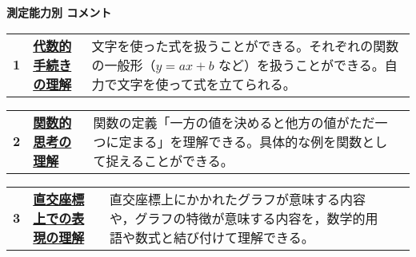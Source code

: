 \textbf{測定能力別 コメント}\par\vspace*{0.3\baselineskip}
\begin{tabularx}{0.98\linewidth}{clX}
    \textbf{1} & \underline{\textbf{代数的手続きの理解}} & 文字を使った式を扱うことができる。それぞれの関数の一般形（$y=ax+b$ など）を扱うことができる。自力で文字を使って式を立てられる。\\
\end{tabularx}\par\vspace*{-0.8em}
\hspace*{3em}\begin{screen}
\end{screen}\par\vspace*{0.5\baselineskip}
\begin{tabularx}{0.98\linewidth}{clXX}
    \textbf{2} & \underline{\textbf{関数的思考の理解}} & 関数の定義「一方の値を決めると他方の値がただ一つに定まる」を理解できる。具体的な例を関数として捉えることができる。\\
\end{tabularx}\par\vspace*{-0.8em}
\hspace*{3em}\begin{screen}
\end{screen}\par\vspace*{0.5\baselineskip}
\begin{tabularx}{0.98\linewidth}{clXX}
    \textbf{3} & \underline{\textbf{直交座標上での表現の理解}} & 直交座標上にかかれたグラフが意味する内容や，グラフの特徴が意味する内容を，数学的用語や数式と結び付けて理解できる。\\
\end{tabularx}\par\vspace*{-0.8em}
\hspace*{3em}\begin{screen}
\end{screen}\vspace*{0.5\baselineskip}
